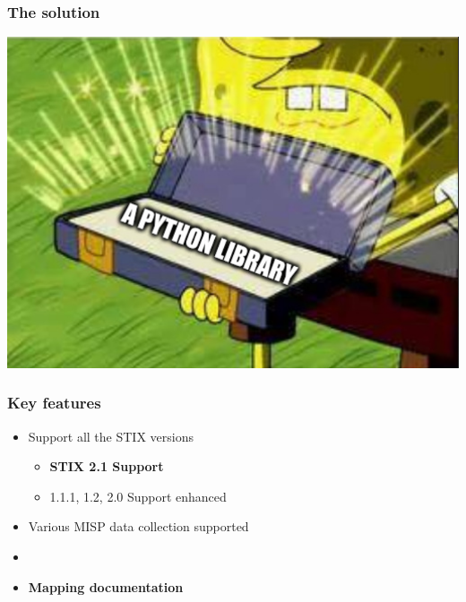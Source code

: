 \begin{frame}
    \frametitle{The solution}
    \begin{center}
        \includegraphics[scale=0.3]{images/solution.png}
    \end{center}
\end{frame}

\begin{frame}
    \frametitle{Key features}
    \begin{itemize}
        \item Support all the STIX versions
        \begin{itemize}
            \item {\bf STIX 2.1 Support}
            \item 1.1.1, 1.2, 2.0 Support enhanced
        \end{itemize}
        \item Various MISP data collection supported
        \item[]
        \item {\bf Mapping documentation}
        
    \end{itemize}
\end{frame}

